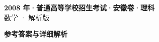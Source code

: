 \documentclass[zihao=-4, a4paper]{ctexart}
\begin{document}
\begin{center}
  {\Large\bfseries 2008 年·普通高等学校招生考试·安徽卷·理科}\\[4pt]
  {\large 数学 · 解析版}
\end{center}
\medskip
{}

\clearpage
{}
\begin{center}{\Large\bfseries 参考答案与详细解析}\end{center}
\medskip

\end{document}
